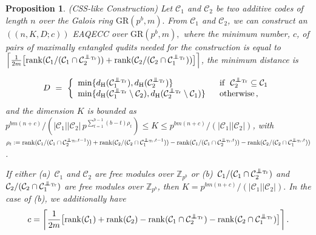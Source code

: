 \documentclass{article}
\DeclareMathOperator{\Tr}{Tr}
\DeclareMathOperator{\rank}{rank}
\newcommand\independent{\protect\mathpalette{\protect\independenT}{\perp}}
\def\independenT#1#2{\mathrel{\rlap{$#1#2$}\mkern3mu{#1#2}}}
\newtheorem{prop}{Proposition}[section]
\theoremstyle{remark}
\theoremstyle{definition}
\numberwithin{equation}{section}
\begin{document}
\begin{prop}\label{prop:CSS} (CSS-like Construction) Let $\mathcal{C}_1$ and $\mathcal{C}_2$ be two  additive codes of length $n$ over the Galois ring $\text{GR}(p^b,m).$  From $\mathcal{C}_1$ and $\mathcal{C}_2$,  we can construct  an $((n,K,D;c))$ EAQECC over $\text{GR}(p^b,m),$ where the minimum number, $c$, of pairs of maximally entangled qudits needed for the construction is equal to  $\left\lceil \frac1{2m}\bigl[\rank(\mathcal{C}_1/(\mathcal{C}_1 \cap \mathcal{C}_2^{\independent_{\Tr}})) + \rank(\mathcal{C}_2/(\mathcal{C}_2 \cap \mathcal{C}_1^{\independent_{\Tr}}))\bigr]  \right\rceil$, the minimum distance is

\begin{equation*}
D~=~\left\{\begin{array}{ll}
\min\{ d_{\mathrm{H}}(\mathcal{C}_1^{\independent_{\Tr}}), d_{\mathrm{H}}(\mathcal{C}_2^{\independent_{\Tr}})\} & \text{~~if~~} \mathcal{C}_2^{\independent_{\Tr}} \subseteq \mathcal{C}_1 \\
\min\{d_{\mathrm{H}}(\mathcal{C}_1^{\independent_{\Tr}}\setminus \mathcal{C}_2 ), d_{\mathrm{H}}(\mathcal{C}_2^{\independent_{\Tr}}\setminus \mathcal{C}_1 ) \} & \text{~~otherwise}\,,
\end{array}\right.
\end{equation*}
and the dimension $K$ is bounded as $p^{bm(n+c)}/ (|\mathcal{C}_1||\mathcal{C}_2| \, {p^{\sum_{t=1}^{b-1} (b-t)\rho_t}}) \leq  K \leq p^{bm(n+c)}/(|\mathcal{C}_1||\mathcal{C}_2|)$, with $\rho_t := \rank(\mathcal{C}_1/(\mathcal{C}_1 \cap \mathcal{C}_2^{\independent_{\Tr},t-1}))+\rank(\mathcal{C}_2/(\mathcal{C}_2 \cap \mathcal{C}_1^{\independent_{\Tr},t-1}))-\rank(\mathcal{C}_1/(\mathcal{C}_1 \cap \mathcal{C}_2^{\independent_{\Tr},t}))-\rank(\mathcal{C}_2/(\mathcal{C}_2 \cap \mathcal{C}_1^{\independent_{\Tr},t}))$.   

If either \emph{(a)}~$\mathcal{C}_1$ and  $\mathcal{C}_2$ are  free modules over $\mathbb{Z}_{p^b}$ or \emph{(b)}~$\mathcal{C}_1/(\mathcal{C}_1 \cap \mathcal{C}_2^{\independent_{\Tr}})$ and  $\mathcal{C}_2/(\mathcal{C}_2 \cap \mathcal{C}_1^{\independent_{\Tr}})$ are free modules over $\mathbb{Z}_{p^b}$, then $K = {p^{bm(n+c)}}/{(|\mathcal{C}_1||\mathcal{C}_2|)}.$  In the case of \emph{(b)}, we additionally have $$c=\left\lceil \frac1{2m}\bigl[\rank(\mathcal{C}_1)+\rank(\mathcal{C}_2) - \rank(\mathcal{C}_1 \cap \mathcal{C}_2^{\independent_{\Tr}}) - \rank(\mathcal{C}_2 \cap \mathcal{C}_1^{\independent_{\Tr}})\bigr]  \right\rceil.$$
\end{prop}
\end{document}
